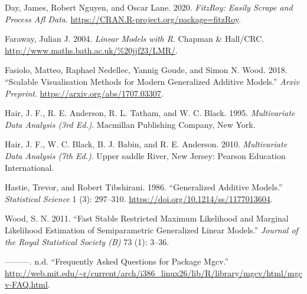 \documentclass{article}
\begin{document}
\hypertarget{refs}{}
\leavevmode\hypertarget{ref-fitzRoy}{}%
Day, James, Robert Nguyen, and Oscar Lane. 2020. \emph{FitzRoy: Easily
Scrape and Process Afl Data}.
\url{https://CRAN.R-project.org/package=fitzRoy}.

\leavevmode\hypertarget{ref-R:Faraway:2004}{}%
Faraway, Julian J. 2004. \emph{Linear Models with R}. Chapman \&
Hall/CRC. \url{http://www.maths.bath.ac.uk/\%20jjf23/LMR/}.

\leavevmode\hypertarget{ref-mgcViz}{}%
Fasiolo, Matteo, Raphael Nedellec, Yannig Goude, and Simon N. Wood.
2018. ``Scalable Visualisation Methods for Modern Generalized Additive
Models.'' \emph{Arxiv Preprint}. \url{https://arxiv.org/abs/1707.03307}.

\leavevmode\hypertarget{ref-multi2}{}%
Hair, J. F., R. E. Anderson, R. L. Tatham, and W. C. Black. 1995.
\emph{Multivariate Data Analysis (3rd Ed.)}. Macmillan Publishing
Company, New York.

\leavevmode\hypertarget{ref-multi1}{}%
Hair, J. F., W. C. Black, B. J. Babin, and R. E. Anderson. 2010.
\emph{Multivariate Data Analysis (7th Ed.)}. Upper saddle River, New
Jersey: Pearson Education International.

\leavevmode\hypertarget{ref-10.1214ux2fssux2f1177013604}{}%
Hastie, Trevor, and Robert Tibshirani. 1986. ``Generalized Additive
Models.'' \emph{Statistical Science} 1 (3): 297--310.
\url{https://doi.org/10.1214/ss/1177013604}.

\leavevmode\hypertarget{ref-mgcv}{}%
Wood, S. N. 2011. ``Fast Stable Restricted Maximum Likelihood and
Marginal Likelihood Estimation of Semiparametric Generalized Linear
Models.'' \emph{Journal of the Royal Statistical Society (B)} 73 (1):
3--36.

\leavevmode\hypertarget{ref-wood}{}%
---------. n.d. ``Frequently Asked Questions for Package Mgcv.''
\url{http://web.mit.edu/~r/current/arch/i386_linux26/lib/R/library/mgcv/html/mgcv-FAQ.html}.



\end{document}

